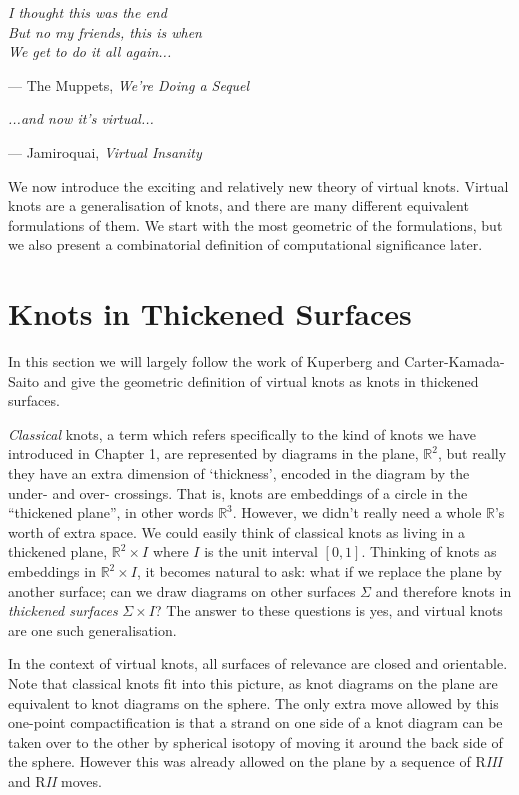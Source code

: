 \documentclass[12pt]{report}
\newcommand{\R}{\mathbb{R}}
\begin{document}
\epigraph{\itshape I thought this was the end\\But no my friends, this is when\\We get to do it all again...}{--- The Muppets, \textit{We're Doing a Sequel}}
\epigraph{\itshape ...and now it's virtual...}{--- Jamiroquai, \textit{Virtual Insanity}}


We now introduce the exciting and relatively new theory of virtual knots. Virtual knots are a generalisation of knots, and there are many different equivalent formulations of them. We start with the most geometric of the formulations, but we also present a combinatorial definition of computational significance later.


\section{Knots in Thickened Surfaces}

In this section we will largely follow the work of Kuperberg \cite{what-is-a-virtual-link} and Carter-Kamada-Saito \cite{stable-equivalence-virtual-cobordisms} and give the geometric definition of virtual knots as knots in thickened surfaces.

\textit{Classical} knots, a term which refers specifically to the kind of knots we have introduced in Chapter 1, are represented by diagrams in the plane, $\R^{2}$, but really they have an extra dimension of `thickness', encoded in the diagram by the under- and over- crossings. That is, knots are embeddings of a circle in the ``thickened plane'', in other words $\R^{3}$. However, we didn't really need a whole $\R$'s worth of extra space. We could easily think of classical knots as living in a thickened plane, $\R^{2} \times I$ where $I$ is the unit interval $[0, 1]$. Thinking of knots as embeddings in $\R^{2} \times I$, it becomes natural to ask: what if we replace the plane by another surface; can we draw diagrams on other surfaces $\Sigma$ and therefore knots in \textit{thickened surfaces} $\Sigma \times I$? The answer to these questions is yes, and virtual knots are one such generalisation.

In the context of virtual knots, all surfaces of relevance are closed and orientable. Note that classical knots fit into this picture, as knot diagrams on the plane are equivalent to knot diagrams on the sphere. The only extra move allowed by this one-point compactification is that a strand on one side of a knot diagram can be taken over to the other by spherical isotopy of moving it around the back side of the sphere. However this was already allowed on the plane by a sequence of R\textit{III} and R\textit{II} moves.
\end{document}
